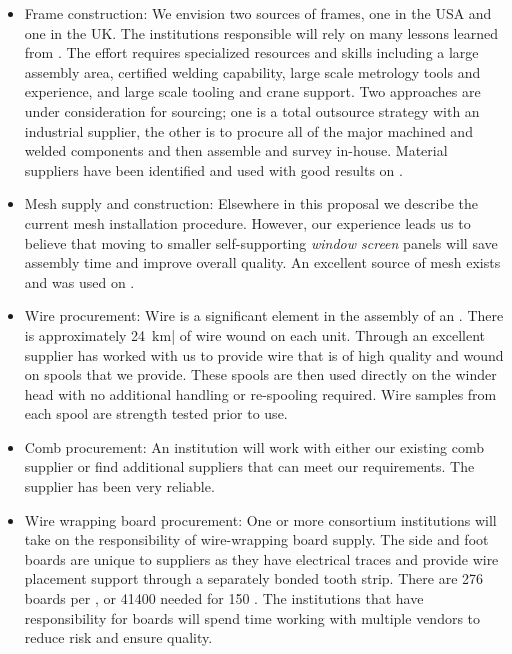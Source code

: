\begin{itemize}

\item Frame construction: We envision two sources of frames, one in the USA and one in the UK. The institutions responsible will rely on many lessons learned from . The effort requires specialized resources and skills including a large assembly area, certified welding capability, large scale metrology tools and experience, and large scale tooling and crane support. Two approaches are under consideration for sourcing; one is a total outsource strategy with an industrial supplier, the other is to procure all of the major machined and welded components and then assemble and survey in-house. Material suppliers have been identified and used with good results on .

\item Mesh supply and construction: Elsewhere in this proposal we describe the current mesh installation procedure. However, our  experience leads us to believe that moving to smaller self-supporting \textit{window screen} panels will save assembly time and improve overall  quality. An excellent source of mesh exists and was used on .

\item Wire procurement: Wire is a significant element in the assembly of an . There is approximately \SI{24}{km}| of wire wound on each unit. Through  %
an excellent supplier %
has worked with us to provide wire that is of high quality and wound on spools that we provide. These spools are then used directly on the winder head with no additional handling or re-spooling required. Wire samples from each spool are strength tested prior to use.

\item Comb procurement: An institution will work with either our existing comb supplier or find additional suppliers that can meet our requirements. The  supplier has been very reliable.

\item Wire wrapping board procurement: One or more consortium institutions will take on the responsibility of wire-wrapping board supply. The side and foot boards are unique to suppliers as they have electrical traces and provide wire placement support through a separately bonded tooth strip. There are \num{276} boards per , or \num{41400} needed for \num{150} . The institutions that have responsibility for boards will spend time working with multiple vendors to reduce risk and ensure quality. 


\end{itemize}
